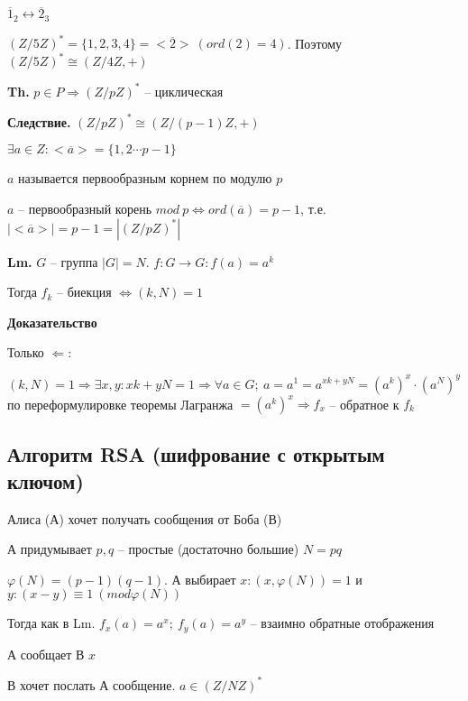 \documentclass[14pt, letter paper]{article}
\begin{document}
$\overline{1}_2 \leftrightarrow \overline{2}_3$

$(Z/5Z)^* = \{1, 2, 3, 4\} = <\overline{2}>\ (ord(2) = 4)$. Поэтому $(Z/5Z)^* \cong (Z/4Z, +)$

\vspace{5mm}

\textbf{Th.} $p \in P \Rightarrow (Z/pZ)^*$ -- циклическая

\textbf{Следствие.} $(Z/pZ)^* \cong (Z/(p-1)Z, +)$

$\exists a \in Z : <\overline{a}> = \{1, 2 \cdots p-1\}$

$a$ называется первообразным корнем по модулю $p$

$a$ -- первообразный корень $mod\ p \Leftrightarrow ord(\overline{a}) = p - 1$, т.е. $|<\overline{a}>| = p - 1 = |(Z/pZ)^*|$

\vspace{5mm}

\textbf{Lm.} $G$ -- группа $|G| = N$. $f : G \rightarrow G : f(a) = a^k$

Тогда $f_k$ -- биекция $\Leftrightarrow (k, N) = 1$

\begin{center}
    \textbf{Доказательство}
\end{center}

Только $\Leftarrow$:

$(k, N) = 1 \Rightarrow \exists x, y : xk + yN = 1 \Rightarrow \forall a \in G;\ a = a^1 = a^{xk + yN} = (a^k)^x \cdot (a^N)^y$ по переформулировке теоремы Лагранжа $= (a^k)^x \Rightarrow f_x$ -- обратное к $f_k$

\begin{center}
    \section*{Алгоритм RSA (шифрование с открытым ключом)}
\end{center}

Алиса (А) хочет получать сообщения от Боба (В)

А придумывает $p, q$ -- простые (достаточно большие) $N = pq$

$\varphi(N) = (p-1)(q-1)$. А выбирает $x : (x, \varphi(N)) = 1$ и $y : (x - y) \equiv 1\ (mod \varphi(N))$

Тогда как в Lm. $f_x(a) = a^x;\ f_y(a) = a^y$ -- взаимно обратные отображения

А сообщает В $x$

В хочет послать А сообщение. $a \in (Z/NZ)^*$
\end{document}
